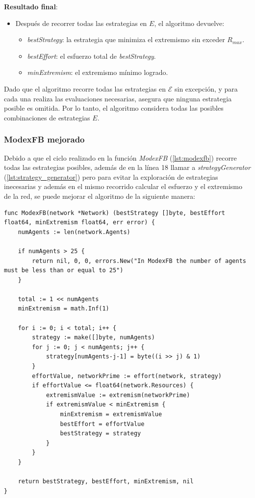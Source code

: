\documentclass[letterpaper,10pt]{article}
\begin{document}
\textbf{Resultado final}:
\begin{itemize}
    \item Después de recorrer todas las estrategias en $E$, el algoritmo devuelve:
    \begin{itemize}
        \item \textit{bestStrategy}: la estrategia que minimiza el extremismo sin exceder $R_{max}$.
        \item \textit{bestEffort}: el esfuerzo total de \textit{bestStrategy}.
        \item \textit{minExtremism}: el extremismo mínimo logrado.
    \end{itemize}
\end{itemize}

Dado que el algoritmo recorre todas las estrategias en $\mathcal{E}$ sin excepción, y para cada una realiza las evaluaciones necesarias, asegura que ninguna estrategia posible es omitida. Por lo tanto, el algoritmo considera todas las posibles combinaciones de estrategias $E$.

\subsubsection*{ModexFB mejorado}

Debido a que el ciclo realizado en la función \textit{ModexFB} (\ref{lst:modexfb}) recorre todas las estrategias posibles, además de en la línea 18 llamar a \textit{strategyGenerator} (\ref{lst:strategy_generator}) pero para evitar la exploración de estrategias inecesarias y además en el mismo recorrido calcular el esfuerzo y el extremismo de la red, se puede mejorar el algoritmo de la siguiente manera:
\begin{lstlisting}[caption={ModexFB mejorado}, label={lst:modexfb_mejorado}]
func ModexFB(network *Network) (bestStrategy []byte, bestEffort float64, minExtremism float64, err error) {
	numAgents := len(network.Agents)

	if numAgents > 25 {
		return nil, 0, 0, errors.New("In ModexFB the number of agents must be less than or equal to 25")
	}

	total := 1 << numAgents
	minExtremism = math.Inf(1)

	for i := 0; i < total; i++ {
		strategy := make([]byte, numAgents)
		for j := 0; j < numAgents; j++ {
			strategy[numAgents-j-1] = byte((i >> j) & 1)
		}
		effortValue, networkPrime := effort(network, strategy)
		if effortValue <= float64(network.Resources) {
			extremismValue := extremism(networkPrime)
			if extremismValue < minExtremism {
				minExtremism = extremismValue
				bestEffort = effortValue
				bestStrategy = strategy
			}
		}
	}

	return bestStrategy, bestEffort, minExtremism, nil
}
\end{lstlisting}
\end{document}
